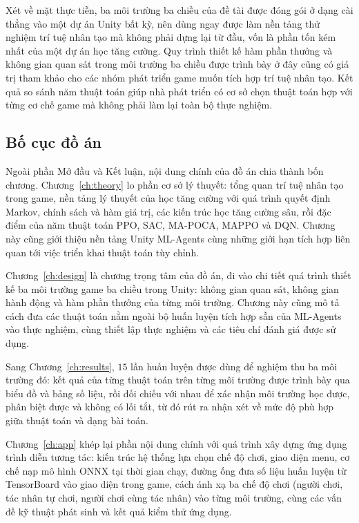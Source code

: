 \indent Xét về mặt thực tiễn, ba môi trường ba chiều của đề tài được đóng gói ở dạng cài
thẳng vào một dự án Unity bất kỳ, nên dùng ngay được làm nền tảng thử nghiệm trí tuệ nhân
tạo mà không phải dựng lại từ đầu, vốn là phần tốn kém nhất của một dự án học tăng cường.
Quy trình thiết kế hàm phần thưởng và không gian quan sát trong môi trường ba chiều được
trình bày ở đây cũng có giá trị tham khảo cho các nhóm phát triển game muốn tích hợp trí
tuệ nhân tạo. Kết quả so sánh năm thuật toán giúp nhà phát triển có cơ sở chọn thuật toán hợp với từng cơ chế game mà không phải
làm lại toàn bộ thực nghiệm.

\subsection{Bố cục đồ án}
\indent Ngoài phần Mở đầu và Kết luận, nội dung chính của đồ án chia thành bốn chương.
Chương~\ref{ch:theory} lo phần cơ sở lý thuyết: tổng quan trí tuệ nhân tạo trong game,
nền tảng lý thuyết của học tăng cường với quá trình quyết định Markov, chính sách và hàm
giá trị, các kiến trúc học tăng cường sâu, rồi đặc điểm của năm thuật toán PPO, SAC,
MA-POCA, MAPPO và DQN. Chương này cũng giới thiệu nền tảng Unity ML-Agents cùng những
giới hạn tích hợp liên quan tới việc triển khai thuật toán tùy chỉnh.

\indent Chương~\ref{ch:design} là chương trọng tâm của đồ án, đi vào chi tiết quá trình
thiết kế ba môi trường game ba chiều trong Unity: không gian quan sát, không gian hành
động và hàm phần thưởng của từng môi trường. Chương này cũng mô tả cách đưa các thuật
toán nằm ngoài bộ huấn luyện tích hợp sẵn của ML-Agents vào thực nghiệm, cùng thiết lập
thực nghiệm và các tiêu chí đánh giá được sử dụng. 

Sang Chương~\ref{ch:results}, $15$ lần huấn luyện được dùng để nghiệm thu ba môi trường đó:
kết quả của từng thuật toán trên
từng môi trường được trình bày qua biểu đồ và bảng số liệu, rồi đối chiếu với nhau để xác
nhận môi trường học được, phân biệt được và không có lối tắt, từ đó rút ra nhận xét về
mức độ phù hợp giữa thuật toán và dạng bài toán.

\indent Chương~\ref{ch:app} khép lại phần nội dung chính với quá trình xây dựng ứng dụng
trình diễn tương tác: kiến trúc hệ thống lựa chọn chế độ chơi, giao diện menu, cơ chế nạp
mô hình ONNX tại thời gian chạy, đường ống đưa số liệu huấn luyện từ TensorBoard vào giao
diện trong game, cách ánh xạ ba chế độ chơi (người chơi, tác nhân tự chơi, người chơi cùng
tác nhân) vào từng môi trường, cùng các vấn đề kỹ thuật phát sinh và kết quả kiểm thử ứng
dụng.
